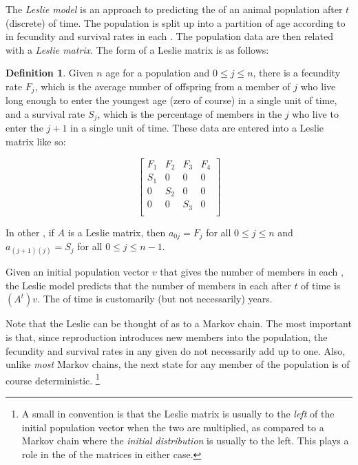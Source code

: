 \documentclass[12pt]{article}
\begin{document}
The \emph{Leslie model} is an approach to predicting the  of an animal population after $t$ (discrete)  of time. The population is split up into a partition of age  according to  in fecundity and survival rates in each . The population  data are then related with a \emph{Leslie matrix}. The  form of a Leslie matrix is as follows:

\theoremstyle{definition}
\newtheorem*{defn}{Definition}
\begin{defn}
Given $n$ age  for a population and $0 \leq j \leq n$, there is a fecundity rate $F_j$, which is the average number of offspring from a member of  $j$ who live long enough to enter the youngest age  (zero of course) in a single unit of time, and a survival rate $S_j$, which is the percentage of members in the  $j$ who live to enter the  $j+1$ in a single unit of time. These data are entered into a Leslie matrix like so:

\begin{displaymath}
\begin{bmatrix}
  F_1 & F_2 & F_3 & F_4 \\
  S_1 &  0  &  0  &  0  \\
   0  & S_2 &  0  &  0  \\
   0  &  0  & S_3 &  0  \\
\end{bmatrix}
\end{displaymath}

In other , if $A$ is a Leslie matrix, then $a_{0j} = F_j$ for all $0 \leq j \leq n$ and $a_{(j+1)(j)} = S_j$ for all $0 \leq j \leq n-1$.
\end{defn}

Given an initial population vector $v$ that gives the number of members in each , the Leslie model predicts that the number of members in each  after $t$  of time is $(A^{t})v$. The  of time is customarily (but not necessarily) years.

Note that the Leslie  can be thought of as  to a Markov chain. The most important  is that, since reproduction introduces new members into the population, the fecundity and survival rates in any given  do not necessarily add up to one. Also, unlike \emph{most} Markov chains, the next state for any member of the population is of course deterministic. \footnote{A small  in convention is that the Leslie matrix is usually to the \emph{left} of the initial population vector when the two are multiplied, as compared to a Markov chain where the \emph{initial distribution} is usually to the left. This plays a role in the  of the matrices in either case.}

\begin{thebibliography}{9}
\end{thebibliography}
\end{document}

